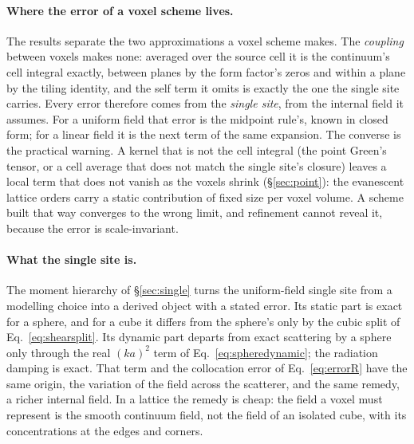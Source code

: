 \documentclass[extra,mreferee]{gji}
\begin{document}
\paragraph{Where the error of a voxel scheme lives.} The results separate the two approximations
a voxel scheme makes. The \emph{coupling} between voxels makes none: averaged over the source cell it
is the continuum's cell integral exactly, between planes by the form factor's zeros and within a
plane by the tiling identity, and the self term it omits is exactly the one the single site
carries. Every error therefore comes from the \emph{single site}, from the internal field it
assumes. For a uniform field that error is the midpoint rule's, known in closed form; for a linear
field it is the next term of the same expansion. The converse is the practical warning. A kernel that
is not the cell integral (the point Green's tensor, or a cell average that does not match the
single site's closure) leaves a local term that does not vanish as the voxels shrink
(\S\ref{sec:point}): the evanescent lattice orders carry a static contribution of fixed size per
voxel volume. A scheme built that way converges to the wrong limit, and refinement cannot reveal
it, because the error is scale-invariant.

\paragraph{What the single site is.} The moment hierarchy of \S\ref{sec:single} turns the
uniform-field single site from a modelling choice into a derived object with a stated error. Its
static part is exact for a sphere, and for a cube it differs from the sphere's only by the cubic
split of Eq.~\eqref{eq:shearsplit}. Its dynamic part departs from exact scattering by a sphere only
through the real $(ka)^2$ term of Eq.~\eqref{eq:spheredynamic}; the radiation damping is exact.
That term and the collocation error of Eq.~\eqref{eq:errorR} have the same origin, the variation of
the field across the scatterer, and the same remedy, a richer internal field. In a lattice the
remedy is cheap: the field a voxel must represent is the smooth continuum field, not the field of an
isolated cube, with its concentrations at the edges and corners.
\end{document}
